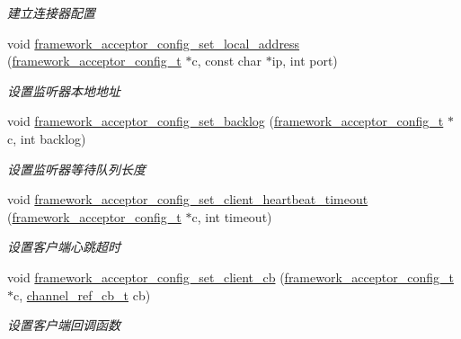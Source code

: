 \begin{DoxyCompactItemize}
\begin{DoxyCompactList}\small\item\em 建立连接器配置 \end{DoxyCompactList}\item 
void \hyperlink{a00054_a5b3c778f37a4c667479d9eae877d3d67_a5b3c778f37a4c667479d9eae877d3d67}{framework\+\_\+acceptor\+\_\+config\+\_\+set\+\_\+local\+\_\+address} (\hyperlink{a00050_a61a4e424ff4c86631423dedd97c40064_a61a4e424ff4c86631423dedd97c40064}{framework\+\_\+acceptor\+\_\+config\+\_\+t} $\ast$c, const char $\ast$ip, int port)
\begin{DoxyCompactList}\small\item\em 设置监听器本地地址 \end{DoxyCompactList}\item 
void \hyperlink{a00054_ae96d14bcf7b70e8ad52fe614ad848c2c_ae96d14bcf7b70e8ad52fe614ad848c2c}{framework\+\_\+acceptor\+\_\+config\+\_\+set\+\_\+backlog} (\hyperlink{a00050_a61a4e424ff4c86631423dedd97c40064_a61a4e424ff4c86631423dedd97c40064}{framework\+\_\+acceptor\+\_\+config\+\_\+t} $\ast$c, int backlog)
\begin{DoxyCompactList}\small\item\em 设置监听器等待队列长度 \end{DoxyCompactList}\item 
void \hyperlink{a00054_ab810538b3fa23ae98027e451f52e4221_ab810538b3fa23ae98027e451f52e4221}{framework\+\_\+acceptor\+\_\+config\+\_\+set\+\_\+client\+\_\+heartbeat\+\_\+timeout} (\hyperlink{a00050_a61a4e424ff4c86631423dedd97c40064_a61a4e424ff4c86631423dedd97c40064}{framework\+\_\+acceptor\+\_\+config\+\_\+t} $\ast$c, int timeout)
\begin{DoxyCompactList}\small\item\em 设置客户端心跳超时 \end{DoxyCompactList}\item 
void \hyperlink{a00054_a93ecf8240201cbc64b76857242fb39d6_a93ecf8240201cbc64b76857242fb39d6}{framework\+\_\+acceptor\+\_\+config\+\_\+set\+\_\+client\+\_\+cb} (\hyperlink{a00050_a61a4e424ff4c86631423dedd97c40064_a61a4e424ff4c86631423dedd97c40064}{framework\+\_\+acceptor\+\_\+config\+\_\+t} $\ast$c, \hyperlink{a00050_ae296ec4d1ce108960de8dcc423956a1d_ae296ec4d1ce108960de8dcc423956a1d}{channel\+\_\+ref\+\_\+cb\+\_\+t} cb)
\begin{DoxyCompactList}\small\item\em 设置客户端回调函数 \end{DoxyCompactList}\item 

\end{DoxyCompactItemize}
